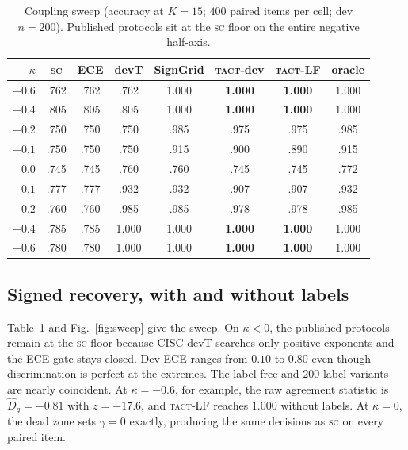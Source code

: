 \documentclass[conference]{IEEEtran}
\newcommand{\Dhat}{\widehat{D}}
\newcommand{\SC}{\textsc{sc}}
\newcommand{\TACT}{\textsc{tact}}
\begin{document}
\begin{table}[t]
\centering
\caption{Coupling sweep (accuracy at $K{=}15$; $400$ paired items per cell; dev $n{=}200$). Published protocols sit at the \SC{} floor on the entire negative half-axis.}
\label{tab:sweep}
\setlength{\tabcolsep}{3.4pt}
\begin{tabular}{r cc cc cc c}
\toprule
$\kappa$ & \SC & ECE & devT & SignGrid & \textbf{\TACT-dev} & \textbf{\TACT-LF} & oracle\\
\midrule
$-0.6$ & .762 & .762 & .762 & 1.000 & \textbf{1.000} & \textbf{1.000} & 1.000\\
$-0.4$ & .805 & .805 & .805 & 1.000 & \textbf{1.000} & \textbf{1.000} & 1.000\\
$-0.2$ & .750 & .750 & .750 & .985 & .975 & .975 & .985\\
$-0.1$ & .750 & .750 & .750 & .915 & .900 & .890 & .915\\
$0.0$  & .745 & .745 & .760 & .760 & .745 & .745 & .772\\
$+0.1$ & .777 & .777 & .932 & .932 & .907 & .907 & .932\\
$+0.2$ & .760 & .760 & .985 & .985 & .978 & .978 & .985\\
$+0.4$ & .785 & .785 & 1.000 & 1.000 & \textbf{1.000} & \textbf{1.000} & 1.000\\
$+0.6$ & .780 & .780 & 1.000 & 1.000 & \textbf{1.000} & \textbf{1.000} & 1.000\\
\bottomrule
\end{tabular}
\end{table}
\subsection{Signed recovery, with and without labels}
Table~\ref{tab:sweep} and Fig.~\ref{fig:sweep} give the sweep. On $\kappa<0$,
the published protocols remain at the \SC{} floor because CISC-devT searches
only positive exponents and the ECE gate stays closed. Dev ECE ranges from
$0.10$ to $0.80$ even though discrimination is perfect at the extremes. The
label-free and $200$-label variants are nearly coincident. At
$\kappa=-0.6$, for example, the raw agreement statistic is
$\Dhat_g=-0.81$ with $z=-17.6$, and \TACT-LF reaches $1.000$ without labels.
At $\kappa=0$, the dead zone sets $\gamma=0$ exactly, producing the same
decisions as \SC{} on every paired item.
\end{document}

